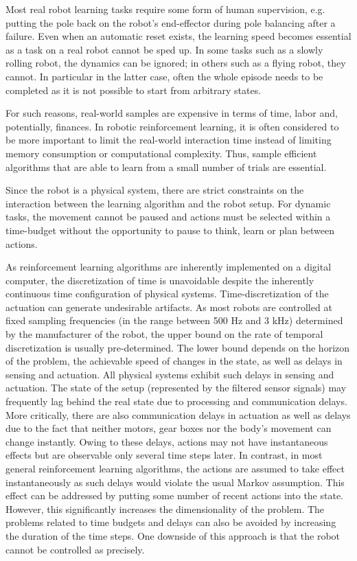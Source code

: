 Most real robot learning tasks require some form of human supervision, e.g. putting the pole back on the robot's end-effector during pole balancing
 after a failure. Even when an automatic reset exists, the learning speed becomes essential as a task on a real robot cannot be sped up.
In some tasks such as a slowly rolling robot, the dynamics can be ignored; in others such as a flying robot, they cannot. In particular in the latter case,
often the whole episode needs to be completed as it is not possible to start from arbitrary states.

For such reasons, real-world samples are expensive in terms of time, labor and, potentially, finances. In robotic reinforcement learning,
it is often considered to be more important to limit the real-world interaction time instead of limiting memory consumption or computational complexity.
Thus, sample efficient algorithms that are able to learn from a small number of trials are essential.

Since the robot is a physical system, there are strict constraints on the interaction between the learning algorithm
and the robot setup. For dynamic tasks, the movement cannot be paused and actions must be selected within a time-budget without 
the opportunity to pause to think, learn or plan between actions.

As reinforcement learning algorithms are inherently implemented on a digital computer, the discretization of
time is unavoidable despite the inherently continuous time configuration of physical systems. Time-discretization of the
actuation can generate undesirable artifacts. As most robots are controlled at fixed sampling frequencies (in the range between
500 Hz and 3 kHz) determined by the manufacturer of the robot, the upper bound on the rate of temporal discretization
is usually pre-determined. The lower bound depends on the horizon of the problem, the achievable speed of changes in
the state, as well as delays in sensing and actuation. All physical systems exhibit such delays in sensing and
actuation. The state of the setup (represented by the filtered sensor signals) may frequently lag behind the real state due
to processing and communication delays. More critically, there are also communication delays in actuation as well
as delays due to the fact that neither motors, gear boxes nor the body's movement can change instantly. Owing to
these delays, actions may not have instantaneous effects but are observable only several time steps later. In contrast, 
in most general reinforcement learning algorithms, the actions are assumed to take effect instantaneously as such
delays would violate the usual Markov assumption. This effect can be addressed by putting some number of recent
actions into the state. However, this significantly increases the dimensionality of the problem.
The problems related to time budgets and delays can also be avoided by increasing the duration of the time steps.
One downside of this approach is that the robot cannot be controlled as precisely.%


